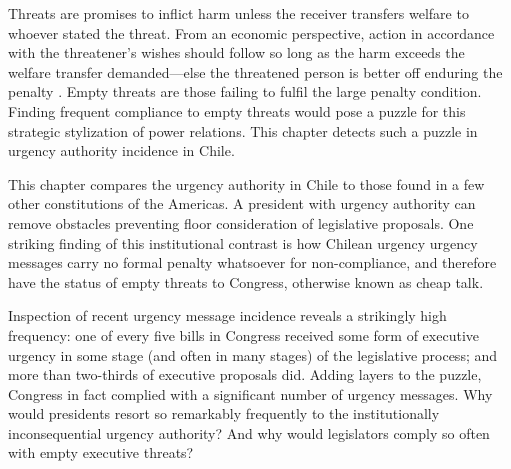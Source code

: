 \documentclass[letter,12pt]{article}
\begin{document}

\onehalfspacing

\noindent Threats are promises to inflict harm unless the receiver transfers welfare to whoever stated the threat. From an economic perspective, action in accordance with the threatener's wishes should follow so long as the harm exceeds the welfare transfer demanded---else the threatened person is better off enduring the penalty \citep{dahl.ConceptPower1957,friedrich.1941,schelling.1960}. Empty threats are those failing to fulfil the large penalty condition. Finding frequent compliance to empty threats would pose a puzzle for this strategic stylization of power relations. This chapter detects such a puzzle in urgency authority incidence in Chile. 

This chapter compares the urgency authority in Chile to those found in a few other constitutions of the Americas. A president with urgency authority can remove obstacles preventing floor consideration of legislative proposals. One striking finding of this institutional contrast is how Chilean urgency urgency messages carry no formal penalty whatsoever for non-compliance, and therefore have the status of empty threats to Congress, otherwise known as cheap talk. 

Inspection of recent urgency message incidence reveals a strikingly high frequency: one of every five bills in Congress received some form of executive urgency in some stage (and often in many stages) of the legislative process; and more than two-thirds of executive proposals did. Adding layers to the puzzle, Congress in fact complied with a significant number of urgency messages. Why would presidents resort so remarkably frequently to the institutionally inconsequential urgency authority? And why would legislators comply so often with empty executive threats?
\end{document}
